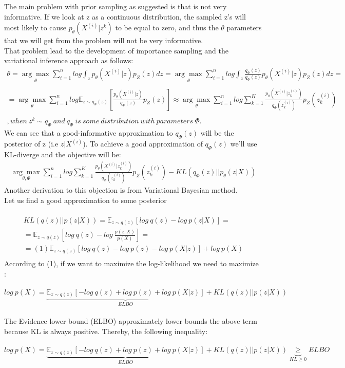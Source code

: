 The main problem with prior sampling as suggested is that is not very informative. If we look at z as a continuous distribution, the sampled z's will most likely to cause $p_{\theta}(X^{(i)}|z^{k})$ to be equal to zero, and thus the $\theta$ parameters that we will get from the problem will not be very informative. \\ That problem lead to the development of importance sampling and the variational inference approach as follows: 
\begin{gather*}
\theta=\underset{\theta}{\arg\max} \sum_{i=1}^{n}log \int_z p_{\theta}(X^{(i)}|z)p_{Z}(z)dz = \underset{\theta}{\arg\max} \sum_{i=1}^{n}log \int_z \frac{q_{\Phi}(z)}{q_{\Phi}(z)}p_{\theta}(X^{(i)}|z)p_{Z}(z)dz= \\ \\ = \underset{\theta}{\arg\max} \sum_{i=1}^{n}log \mathbb{E}_{z \sim q_{\Phi}(z)}[\frac{p_{\theta}(X^{(i)}|z)}{q_{\Phi}(z)}p_{Z}(z)] \approx \underset{\theta}{\arg\max} \sum_{i=1}^{n}log \sum_{k=1}^{K}\frac{p_{\theta}(X^{(i)}|z_{k}^{(i)})}{q_{\Phi}(z_{k}^{(i)})}p_{Z}(z_{k}^{(i)}) \\ \\ , when\ z^{k}\sim q_{\Phi} \ and \ q_{\Phi} \ is \ some \ distribution \ with \ parameters \ \Phi.
\end{gather*}
We can see that a good-informative approximation to $q_{\Phi}(z)$ will be the posterior of z (i.e $z|X^{(i)}$). To achieve a good approximation of $q_{\Phi}(z)$ we'll use KL-diverge and the objective will be: 
\begin{gather*}
\underset{\theta,\Phi}{\arg\max} \sum_{i=1}^{n}log \sum_{k=1}^{K}\frac{p_{\theta}(X^{(i)}|z_{k}^{(i)})}{q_{\Phi}(z_{k}^{(i)})}p_{Z}(z_{k}^{(i)}) - KL(q_{\Phi}(z)||p_{\theta}(z|X))
\end{gather*}
Another derivation to this objection is from Variational Bayesian method.\\
Let us find a good approximation to some posterior\\ \\
\begin{gather*}
KL(q(z)||p(z|X))=\mathbb{E}_{z \sim q(z)}[log \ q(z)-log \ p(z|X)] = \\  
= \mathbb{E}_{z \sim q(z)}[log \ q(z) - log \ \frac{p(z,X)}{p(X)}] = \\ 
=(1) \mathbb{E}_{z \sim q(z)}[log \ q(z) - log \ p(z) - log \ p(X|z)] + log \ p(X) \\ 
\end{gather*}
According to (1), if we want to maximize the log-likelihood we need to maximize : \\ \\
$log \ p(X) = \underbrace{\mathbb{E}_{z \sim q(z)}[-log \ q(z) + log \ p(z) + log \ p(X|z)]}_{ELBO}+KL(q(z)||p(z|X))$ \\ \\
The Evidence lower bound (ELBO) approximately lower bounds the above term because KL is always positive. Thereby, the following inequality: \\ \\
$log \ p(X) = \underbrace{\mathbb{E}_{z \sim q(z)}[-log \ q(z) + log \ p(z) + log \ p(X|z)]}_{ELBO}+KL(q(z)||p(z|X)) \underbrace{\geq}_{KL \geq 0} ELBO $ \\
